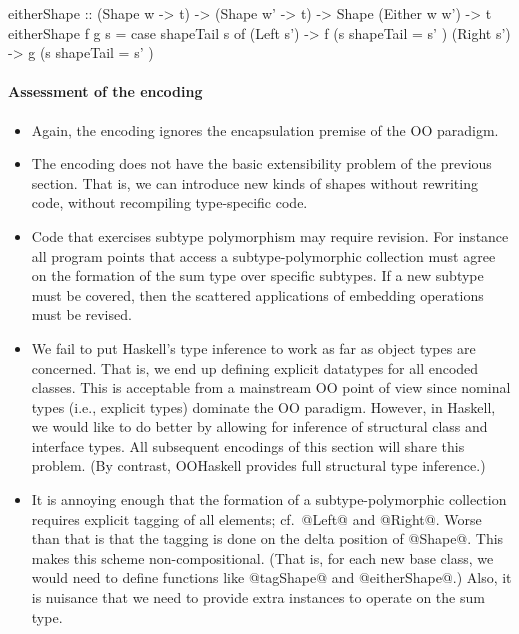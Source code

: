 \documentclass{jfp}
\begin{document}
\begin{code}
 eitherShape :: (Shape w -> t) -> (Shape w' -> t) -> Shape (Either w w') -> t
 eitherShape f g s
   = case shapeTail s of
       (Left s')  -> f (s { shapeTail = s' })
       (Right s') -> g (s { shapeTail = s' })
\end{code}



\paragraph{Assessment of the encoding}

\mbox{}

\begin{itemize}

\item
Again, the encoding ignores the encapsulation premise of the OO paradigm.

\smallskip

\item
The encoding does not have the basic extensibility problem of the
previous section. That is, we can introduce new kinds of shapes
without rewriting code, without recompiling type-specific code.

\smallskip

\item
Code that exercises subtype polymorphism may require revision. For
instance all program points that access a subtype-polymorphic
collection must agree on the formation of the sum type over specific
subtypes. If a new subtype must be covered, then the scattered
applications of embedding operations must be revised.

\smallskip

\item 
We fail to put Haskell's type inference to work as far as object types
are concerned. That is, we end up defining explicit datatypes for all
encoded classes. This is acceptable from a mainstream OO point of view
since nominal types (i.e., explicit types) dominate the OO
paradigm. However, in Haskell, we would like to do better by allowing
for inference of structural class and interface types. All subsequent
encodings of this section will share this problem. (By contrast,
OOHaskell provides full structural type inference.)

\smallskip

\item
It is annoying enough that the formation of a subtype-polymorphic
collection requires explicit tagging of all elements; cf.\ @Left@ and
@Right@. Worse than that is that the tagging is done on the delta
position of @Shape@. This makes this scheme non-compositional. (That
is, for each new base class, we would need to define functions like
@tagShape@ and @eitherShape@.) Also, it is nuisance that we need to
provide extra instances to operate on the sum type.


\end{itemize}
\end{document}

